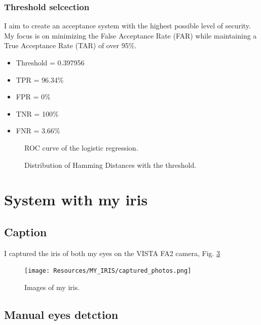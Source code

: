 \documentclass{article}
\begin{document}
\subsubsection{Threshold selcection}
I aim to create an acceptance system with the highest possible level of security.
My focus is on minimizing the False Acceptance Rate (FAR) while maintaining a True Acceptance Rate (TAR) of over 95\%.

\begin{itemize}
  \item Threshold = 0.397956
  \item TPR = 96.34\%
  \item FPR = 0\%
  \item TNR = 100\%
  \item FNR = 3.66\%
\end{itemize}


\begin{figure}[htbp] 
  \centering
  \def\svgscale{0.7}
  
  \caption{ROC curve of the logistic regression.}
  \label{ROC}
\end{figure}

\newpage

\begin{figure}[htbp] 
  \centering
  \def\svgscale{0.7}
  
  \caption{Distribution of Hamming Distances with the threshold.}
  \label{distributions_threshold}
\end{figure}

\section{System with my iris}
\subsection{Caption}
I captured the iris of both my eyes on the VISTA FA2 camera, Fig. \ref{my_iris_captured_photos}

\begin{figure}[ht!]
  \centering
  \texttt{[image: Resources/MY\_IRIS/captured\_photos.png]}
  \caption{Images of my iris.}
  \label{my_iris_captured_photos}
\end{figure}

\newpage

\subsection{Manual eyes detction}
\end{document}
